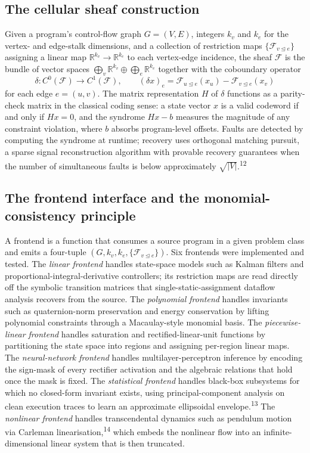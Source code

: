 \documentclass[12pt,a4paper]{article}
\theoremstyle{plain}
\theoremstyle{definition}
\begin{document}
\subsection{The cellular sheaf construction}

Given a program's control-flow graph $G = (V, E)$, integers $k_v$ and $k_e$ for the vertex- and edge-stalk dimensions, and a collection of restriction maps $\{\mathcal{F}_{v \trianglelefteq e}\}$ assigning a linear map $\mathbb{R}^{k_v} \to \mathbb{R}^{k_e}$ to each vertex-edge incidence, the sheaf $\mathcal{F}$ is the bundle of vector spaces $\bigoplus_v \mathbb{R}^{k_v} \oplus \bigoplus_e \mathbb{R}^{k_e}$ together with the coboundary operator
\[
\delta : C^0(\mathcal{F}) \to C^1(\mathcal{F}), \qquad (\delta x)_e = \mathcal{F}_{u \trianglelefteq e}(x_u) - \mathcal{F}_{v \trianglelefteq e}(x_v)
\]
for each edge $e = (u, v)$. The matrix representation $H$ of $\delta$ functions as a parity-check matrix in the classical coding sense: a state vector $x$ is a valid codeword if and only if $Hx = 0$, and the syndrome $Hx - b$ measures the magnitude of any constraint violation, where $b$ absorbs program-level offsets. Faults are detected by computing the syndrome at runtime; recovery uses orthogonal matching pursuit, a sparse signal reconstruction algorithm with provable recovery guarantees when the number of simultaneous faults is below approximately $\sqrt{|V|}$.\textsuperscript{12}

\subsection{The frontend interface and the monomial-consistency principle}

A frontend is a function that consumes a source program in a given problem class and emits a four-tuple $(G, k_v, k_e, \{\mathcal{F}_{v \trianglelefteq e}\})$. Six frontends were implemented and tested. The \textit{linear frontend} handles state-space models such as Kalman filters and proportional-integral-derivative controllers; its restriction maps are read directly off the symbolic transition matrices that single-static-assignment dataflow analysis recovers from the source. The \textit{polynomial frontend} handles invariants such as quaternion-norm preservation and energy conservation by lifting polynomial constraints through a Macaulay-style monomial basis. The \textit{piecewise-linear frontend} handles saturation and rectified-linear-unit functions by partitioning the state space into regions and assigning per-region linear maps. The \textit{neural-network frontend} handles multilayer-perceptron inference by encoding the sign-mask of every rectifier activation and the algebraic relations that hold once the mask is fixed. The \textit{statistical frontend} handles black-box subsystems for which no closed-form invariant exists, using principal-component analysis on clean execution traces to learn an approximate ellipsoidal envelope.\textsuperscript{13} The \textit{nonlinear frontend} handles transcendental dynamics such as pendulum motion via Carleman linearisation,\textsuperscript{14} which embeds the nonlinear flow into an infinite-dimensional linear system that is then truncated.
\end{document}
